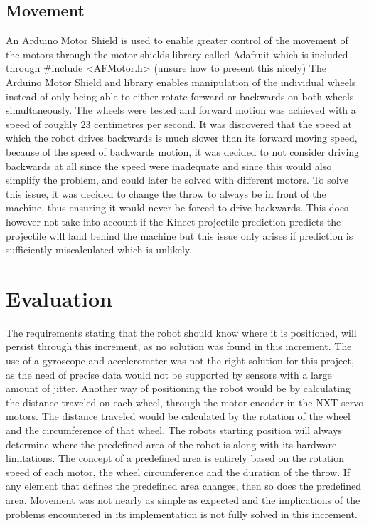 \subsection{Movement}
\label{sec:i1MovementImplementation}
An Arduino Motor Shield is used to enable greater control of the movement of the motors through the motor shields library called Adafruit which is included through #include <AFMotor.h> (unsure how to present this nicely)
The Arduino Motor Shield and library enables manipulation of the individual wheels instead of only being able to either rotate forward or backwards on both wheels simultaneously. 
The wheels were tested and forward motion was achieved with a speed of roughly 23 centimetres per second. It was discovered that the speed at which the robot drives backwards is much slower than its forward moving speed, because of the speed of backwards motion, it was decided to not consider driving backwards at all since the speed were inadequate and since this would also simplify the problem, and could later be solved with different motors. To solve this issue, it was decided to change the throw to always be in front of the machine, thus ensuring it would never be forced to drive backwards. This does however not take into account if the Kinect projectile prediction predicts the projectile will land behind the machine but this issue only arises if prediction is sufficiently miscalculated which is unlikely.

\section{Evaluation}
\label{sec:i1Evaluation}
The requirements stating that the robot should know where it is positioned, will persist through this increment, as no solution was found in this increment. The use of a gyroscope and accelerometer was not the right solution for this project, as the need of precise data would not be supported by sensors with a large amount of jitter. Another way of positioning the robot would be by calculating the distance traveled on each wheel, through the motor encoder in the NXT servo motors. The distance traveled would be calculated by the rotation of the wheel and the circumference of that wheel.
The robots starting position will always determine where the predefined area of the robot is along with its hardware limitations. The concept of a predefined area is entirely based on the rotation speed of each motor, the wheel circumference and the duration of the throw. If any element that defines the predefined area changes, then so does the predefined area. Movement was not nearly as simple as expected and the implications of the problems encountered in its implementation is not fully solved in this increment.

